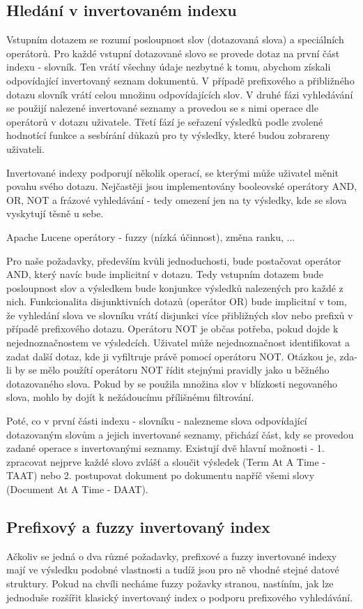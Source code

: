\documentclass[11pt]{article}
\begin{document}
\subsection{Hledání v invertovaném indexu}
Vstupním dotazem se rozumí posloupnost slov (dotazovaná slova) a speciálních
operátorů. Pro každé vstupní dotazované slovo se provede dotaz na první část
indexu - slovník. Ten vrátí všechny údaje nezbytné k tomu, abychom získali
odpovídající invertovaný seznam dokumentů. V případě prefixového a přibližného
dotazu slovník vrátí celou množinu odpovídajících slov.  V druhé fázi
vyhledávání se použijí nalezené invertované seznamy a provedou se s nimi
operace dle operátorů v dotazu uživatele. Třetí fází je seřazení výsledků podle
zvolené hodnotící funkce a sesbírání důkazů pro ty výsledky, které budou
zobrareny uživateli.

Invertované indexy podporují několik operací, se kterými může uživatel měnit
povahu svého dotazu. Nejčastěji jsou implementovány booleovské operátory AND,
OR, NOT a frázové vyhledávání - tedy omezení jen na ty výsledky, kde se slova
vyskytují těsně u sebe.

Apache Lucene operátory - fuzzy (nízká účinnost), změna ranku, ...

Pro naše požadavky, především kvůli jednoduchosti, bude postačovat operátor
AND, který navíc bude implicitní v dotazu. Tedy vstupním dotazem bude
posloupnost slov a výsledkem bude konjunkce výsledků nalezených pro každé z
nich. Funkcionalita disjunktivních dotazů (operátor OR) bude implicitní v tom,
že vyhledání slova ve slovníku vrátí disjunkci více přibližných slov nebo
prefixů v případě prefixového dotazu.  Operátoru NOT je občas potřeba, pokud
dojde k nejednoznačnostem ve výsledcích.  Uživatel může nejednoznačnost
identifikovat a zadat další dotaz, kde ji vyfiltruje právě pomocí operátoru
NOT. Otázkou je, zda-li by se mělo použítí operátoru NOT řídit stejnými
pravidly jako u běžného dotazovaného slova. Pokud by se použila množina slov v
blízkosti negovaného slova, mohlo by dojít k nežádoucímu přílišnému filtrování.

Poté, co v první části indexu - slovníku - nalezneme slova odpovídající
dotazovaným slovům a jejich invertované seznamy, přichází část, kdy se provedou
zadané operace s invertovanými seznamy.  Existují dvě hlavní možnosti - 1.
zpracovat nejprve každé slovo zvlášť a sloučit výsledek (Term At A Time - TAAT)
nebo 2. postupovat dokument po dokumentu napříč všemi slovy (Document At A Time
- DAAT).

\subsection{Prefixový a fuzzy invertovaný index}
Ačkoliv se jedná o dva různé požadavky, prefixové a fuzzy invertované indexy
mají ve výsledku podobné vlastnosti a tudíž jsou pro ně vhodné stejné datové
struktury. Pokud na chvíli necháme fuzzy požavky stranou, nastíním, jak lze
jednoduše rozšířit klasický invertovaný index o podporu prefixového
vyhledávání.
\end{document}
